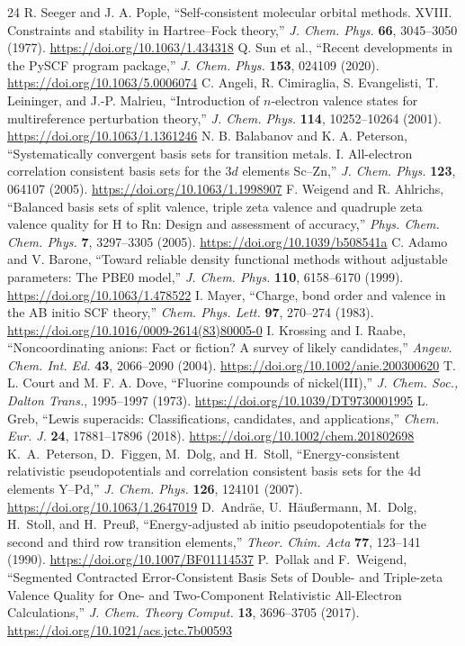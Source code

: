 \documentclass[10pt,twocolumn]{article}
\begin{document}
\begin{thebibliography}{24}
 R. Seeger and J. A. Pople, ``Self-consistent molecular orbital methods. XVIII. Constraints and stability in Hartree--Fock theory,'' \textit{J. Chem. Phys.} \textbf{66}, 3045--3050 (1977). \url{https://doi.org/10.1063/1.434318}
 Q. Sun et al., ``Recent developments in the PySCF program package,'' \textit{J. Chem. Phys.} \textbf{153}, 024109 (2020). \url{https://doi.org/10.1063/5.0006074}
 C. Angeli, R. Cimiraglia, S. Evangelisti, T. Leininger, and J.-P. Malrieu, ``Introduction of $n$-electron valence states for multireference perturbation theory,'' \textit{J. Chem. Phys.} \textbf{114}, 10252--10264 (2001). \url{https://doi.org/10.1063/1.1361246}
 N. B. Balabanov and K. A. Peterson, ``Systematically convergent basis sets for transition metals. I. All-electron correlation consistent basis sets for the $3d$ elements Sc--Zn,'' \textit{J. Chem. Phys.} \textbf{123}, 064107 (2005). \url{https://doi.org/10.1063/1.1998907}
 F. Weigend and R. Ahlrichs, ``Balanced basis sets of split valence, triple zeta valence and quadruple zeta valence quality for H to Rn: Design and assessment of accuracy,'' \textit{Phys. Chem. Chem. Phys.} \textbf{7}, 3297--3305 (2005). \url{https://doi.org/10.1039/b508541a}
 C. Adamo and V. Barone, ``Toward reliable density functional methods without adjustable parameters: The PBE0 model,'' \textit{J. Chem. Phys.} \textbf{110}, 6158--6170 (1999). \url{https://doi.org/10.1063/1.478522}
 I. Mayer, ``Charge, bond order and valence in the AB initio SCF theory,'' \textit{Chem. Phys. Lett.} \textbf{97}, 270--274 (1983). \url{https://doi.org/10.1016/0009-2614(83)80005-0}
 I. Krossing and I. Raabe, ``Noncoordinating anions: Fact or fiction? A survey of likely candidates,'' \textit{Angew. Chem. Int. Ed.} \textbf{43}, 2066--2090 (2004). \url{https://doi.org/10.1002/anie.200300620}
 T. L. Court and M. F. A. Dove, ``Fluorine compounds of nickel(III),'' \textit{J. Chem. Soc., Dalton Trans.}, 1995--1997 (1973). \url{https://doi.org/10.1039/DT9730001995}
 L. Greb, ``Lewis superacids: Classifications, candidates, and applications,'' \textit{Chem. Eur. J.} \textbf{24}, 17881--17896 (2018). \url{https://doi.org/10.1002/chem.201802698}
 K.~A.~Peterson, D.~Figgen, M.~Dolg, and H.~Stoll, ``Energy-consistent relativistic pseudopotentials and correlation consistent basis sets for the 4d elements Y--Pd,'' \textit{J. Chem. Phys.} \textbf{126}, 124101 (2007). \url{https://doi.org/10.1063/1.2647019}
 D.~Andr\"ae, U.~H\"außermann, M.~Dolg, H.~Stoll, and H.~Preuß, ``Energy-adjusted ab initio pseudopotentials for the second and third row transition elements,'' \textit{Theor. Chim. Acta} \textbf{77}, 123--141 (1990). \url{https://doi.org/10.1007/BF01114537}
 P.~Pollak and F.~Weigend, ``Segmented Contracted Error-Consistent Basis Sets of Double- and Triple-zeta Valence Quality for One- and Two-Component Relativistic All-Electron Calculations,'' \textit{J. Chem. Theory Comput.} \textbf{13}, 3696--3705 (2017). \url{https://doi.org/10.1021/acs.jctc.7b00593}
\end{thebibliography}
\end{document}
